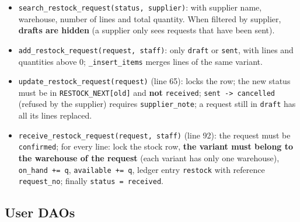 \begin{itemize}
\tightlist
\item
  \texttt{search\_\allowbreak{}restock\_\allowbreak{}request(\allowbreak{}status,\allowbreak{} supplier)}: with supplier
  name, warehouse, number of lines and total quantity. When filtered by
  supplier, \textbf{drafts are hidden} (a supplier only sees requests
  that have been sent).
\item
  \texttt{add\_\allowbreak{}restock\_\allowbreak{}request(\allowbreak{}request,\allowbreak{} staff)}: only \texttt{draft}
  or \texttt{sent}, with lines and quantities above 0;
  \texttt{\_\allowbreak{}insert\_\allowbreak{}items} merges lines of the same variant.
\item
  \texttt{update\_\allowbreak{}restock\_\allowbreak{}request(\allowbreak{}request)} (line 65): locks the row;
  the new status must be in \texttt{RESTOCK\_\allowbreak{}NEXT{[}old{]}} and
  \textbf{not} \texttt{received};
  \texttt{sent -\textgreater{}\allowbreak{} cancelled} (refused by the supplier)
  requires \texttt{supplier\_\allowbreak{}note}; a request still in \texttt{draft}
  has all its lines replaced.
\item
  \texttt{receive\_\allowbreak{}restock\_\allowbreak{}request(\allowbreak{}request,\allowbreak{} staff)} (line 92): the
  request must be \texttt{confirmed}; for every line: lock the stock
  row, \textbf{the variant must belong to the warehouse of the request}
  (each variant has only one warehouse), \texttt{on\_\allowbreak{}hand +=\allowbreak{} q},
  \texttt{available +=\allowbreak{} q}, ledger entry \texttt{restock} with
  reference \texttt{request\_\allowbreak{}no}; finally \texttt{status =\allowbreak{} received}.
\end{itemize}

\hypertarget{user-daos}{%
\subsection{User DAOs}\label{user-daos}}

